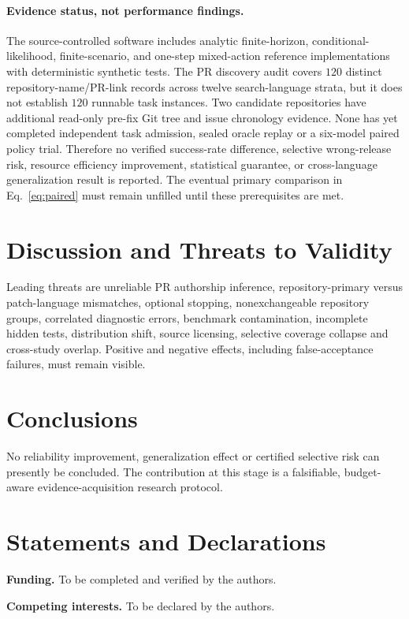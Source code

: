 \documentclass[pdflatex,sn-basic]{sn-jnl}
\begin{document}
\paragraph{Evidence status, not performance findings.}
The source-controlled software includes analytic finite-horizon,
conditional-likelihood, finite-scenario, and one-step mixed-action
reference implementations with deterministic synthetic tests.
The PR discovery audit covers $120$ distinct repository-name/PR-link
records across twelve search-language strata, but it does not
establish $120$ runnable task instances. Two candidate repositories
have additional read-only pre-fix Git tree and issue chronology
evidence. None has yet completed independent task admission, sealed
oracle replay or a six-model paired policy trial. Therefore no
verified success-rate difference, selective wrong-release risk,
resource efficiency improvement, statistical guarantee, or
cross-language generalization result is reported. The eventual
primary comparison in Eq.~\eqref{eq:paired} must remain unfilled
until these prerequisites are met.

\section{Discussion and Threats to Validity}\label{sec:discussion}
Leading threats are unreliable PR authorship inference, repository-primary
versus patch-language mismatches, optional stopping, nonexchangeable
repository groups, correlated diagnostic errors, benchmark contamination,
incomplete hidden tests, distribution shift, source licensing, selective
coverage collapse and cross-study overlap. Positive and negative effects,
including false-acceptance failures, must remain visible.

\section{Conclusions}\label{sec:conclusions}
No reliability improvement, generalization effect or certified selective
risk can presently be concluded. The contribution at this stage is a
falsifiable, budget-aware evidence-acquisition research protocol.

\section*{Statements and Declarations}
\textbf{Funding.} To be completed and verified by the authors.

\textbf{Competing interests.} To be declared by the authors.
\end{document}
